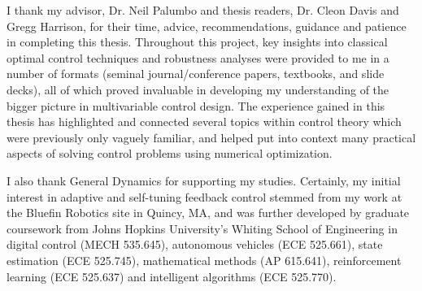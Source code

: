 \label{chap:acknowledgments}

I thank my advisor, Dr. Neil Palumbo and thesis readers, Dr. Cleon Davis and Gregg Harrison, for their time, advice, recommendations, guidance and patience in completing this thesis.  Throughout this project, key insights into classical optimal control techniques and robustness analyses were provided to me in a number of formats (seminal journal/conference papers, textbooks, and slide decks), all of which proved invaluable in developing my understanding of the bigger picture in multivariable control design.  The experience gained in this thesis has highlighted and connected several topics within control theory which were previously only vaguely familiar, and helped put into context many practical aspects of solving control problems using numerical optimization.

I also thank General Dynamics for supporting my studies.  Certainly, my initial interest in adaptive and self-tuning feedback control stemmed from my work at the Bluefin Robotics site in Quincy, MA, and was further developed by graduate coursework from Johns Hopkins University's Whiting School of Engineering in digital control (MECH 535.645), autonomous vehicles (ECE 525.661), state estimation (ECE 525.745), mathematical methods (AP 615.641), reinforcement learning (ECE 525.637) and intelligent algorithms (ECE 525.770).